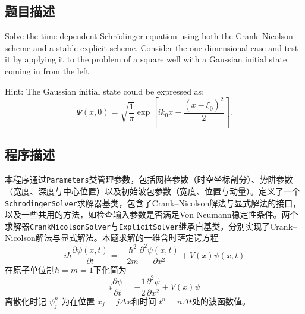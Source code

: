\subsection{题目描述}
\noindent
Solve the time-dependent Schrödinger equation using both the Crank–Nicolson scheme and a stable explicit scheme. Consider the one-dimensional case and test it by applying it to the problem of a square well with a Gaussian initial state coming in from the left.

\noindent
Hint: The Gaussian initial state could be expressed as:
\[
    \Psi(x, 0) = \sqrt{\frac{1}{\pi}} \exp\left[ i k_0 x - \frac{(x - \xi_0)^2}{2} \right].
\]


\subsection{程序描述}
本程序通过\texttt{Parameters}类管理参数，包括网格参数（时空坐标剖分）、势阱参数（宽度、深度与中心位置）以及初始波包参数（宽度、位置与动量）。定义了一个\texttt{SchrodingerSolver}求解器基类，包含了Crank–Nicolson解法与显式解法的接口，以及一些共用的方法，如检查输入参数是否满足Von Neumann稳定性条件。两个求解器\texttt{CrankNicolsonSolver}与\texttt{ExplicitSolver}继承自基类，分别实现了Crank–Nicolson解法与显式解法。本题求解的一维含时薛定谔方程
\[
    i\hbar \frac{\partial \psi(x,t)}{\partial t} = -\frac{\hbar^2}{2m} \frac{\partial^2 \psi(x,t)}{\partial x^2} + V(x) \psi(x,t)
\]在原子单位制$\hbar = m =1$下化简为
\[
    i \frac{\partial \psi}{\partial t} = -\frac{1}{2} \frac{\partial^2 \psi}{\partial x^2} + V(x) \psi
\]
离散化时记 $\psi_j^n$ 为在位置 $x_j = j \Delta x $和时间 $t^n = n \Delta t $处的波函数值。
